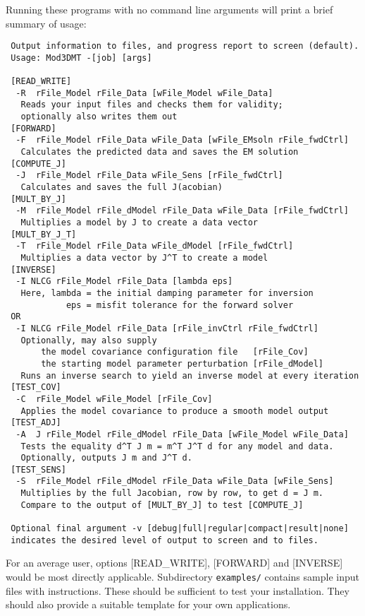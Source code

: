 \documentclass[12pt]{article}
\begin{document}
Running these programs with no command line arguments will print a brief summary of
usage:
\begin{verbatim}
 Output information to files, and progress report to screen (default).
 Usage: Mod3DMT -[job] [args]

 [READ_WRITE]
  -R  rFile_Model rFile_Data [wFile_Model wFile_Data]
   Reads your input files and checks them for validity;
   optionally also writes them out
 [FORWARD]
  -F  rFile_Model rFile_Data wFile_Data [wFile_EMsoln rFile_fwdCtrl]
   Calculates the predicted data and saves the EM solution
 [COMPUTE_J]
  -J  rFile_Model rFile_Data wFile_Sens [rFile_fwdCtrl]
   Calculates and saves the full J(acobian)
 [MULT_BY_J]
  -M  rFile_Model rFile_dModel rFile_Data wFile_Data [rFile_fwdCtrl]
   Multiplies a model by J to create a data vector
 [MULT_BY_J_T]
  -T  rFile_Model rFile_Data wFile_dModel [rFile_fwdCtrl]
   Multiplies a data vector by J^T to create a model
 [INVERSE]
  -I NLCG rFile_Model rFile_Data [lambda eps]
   Here, lambda = the initial damping parameter for inversion
            eps = misfit tolerance for the forward solver
 OR
  -I NLCG rFile_Model rFile_Data [rFile_invCtrl rFile_fwdCtrl]
   Optionally, may also supply
       the model covariance configuration file   [rFile_Cov]
       the starting model parameter perturbation [rFile_dModel]
   Runs an inverse search to yield an inverse model at every iteration
 [TEST_COV]
  -C  rFile_Model wFile_Model [rFile_Cov]
   Applies the model covariance to produce a smooth model output
 [TEST_ADJ]
  -A  J rFile_Model rFile_dModel rFile_Data [wFile_Model wFile_Data]
   Tests the equality d^T J m = m^T J^T d for any model and data.
   Optionally, outputs J m and J^T d.
 [TEST_SENS]
  -S  rFile_Model rFile_dModel rFile_Data wFile_Data [wFile_Sens]
   Multiplies by the full Jacobian, row by row, to get d = J m.
   Compare to the output of [MULT_BY_J] to test [COMPUTE_J]

 Optional final argument -v [debug|full|regular|compact|result|none]
 indicates the desired level of output to screen and to files.

\end{verbatim}

For an average user, options [READ\_WRITE], [FORWARD] and [INVERSE] would be most directly applicable.
Subdirectory \verb"examples/" contains sample input files with instructions.
These should be sufficient to test your installation. They should also provide a suitable template for your own applications.\\
\end{document}
